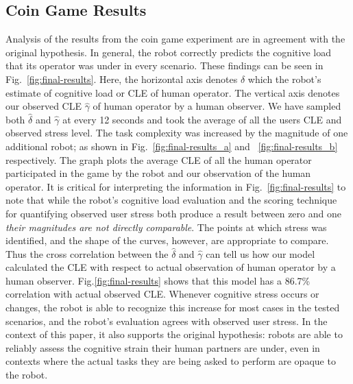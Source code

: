 \documentclass{sig-alternate}
\begin{document}

\subsection{Coin Game Results}

Analysis of the results from the coin game experiment are in agreement
with the original hypothesis. In general, the robot correctly predicts
the cognitive load that its operator was under in every
scenario. These findings can be seen in Fig.~\ref{fig:final-results}.
Here, the horizontal axis denotes $\hat{\delta}$ which the robot's estimate of cognitive load or CLE of human operator. The vertical axis denotes our observed CLE $\hat{\gamma}$ of human operator by a human observer. We have sampled both $\hat{\delta}$ and $\hat{\gamma}$ at every 12 seconds and took the average of all the users CLE and observed stress level. The task complexity was increased by the magnitude of one additional robot; as shown in Fig.~\ref{fig:final-results_a} and ~\ref{fig:final-results_b} respectively. The graph plots the average CLE of all the human operator participated in the game by the robot and our observation of the human operator. It is critical for interpreting the
information in Fig.~\ref{fig:final-results} to note that while the robot's
cognitive load evaluation and the scoring technique for quantifying
observed user stress both produce a result between zero and one
\textit{their magnitudes are not directly comparable}. The points at
which stress was identified, and the shape of the curves, however, are
appropriate to compare. Thus the cross correlation between the $\hat{\delta}$ and $\hat{\gamma}$ can tell us how our model calculated the CLE with respect to actual observation of human operator by a human observer. Fig.\ref{fig:final-results} shows that this model has a 86.7\% correlation with actual observed CLE. Whenever cognitive stress occurs or changes,
the robot is able to recognize this increase for most cases in the
tested scenarios, and the robot's evaluation agrees with observed
user stress.  In the context of this paper, it also supports the
original hypothesis: robots are able to reliably assess the
cognitive strain their human partners are under, even in contexts
where the actual tasks they are being asked to perform are opaque to
the robot.
\end{document}
